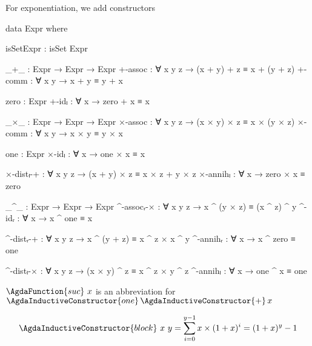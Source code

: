 For exponentiation, we add constructors
\begin{code}
  data Expr where
\end{code}
\begin{code}[hide]
    isSetExpr : isSet Expr

    _+_ : Expr → Expr → Expr
    +-assoc : ∀ x y z → (x + y) + z ≡ x + (y + z)
    +-comm : ∀ x y → x + y ≡ y + x

    zero : Expr
    +-idₗ : ∀ x → zero + x ≡ x

    _×_ : Expr → Expr → Expr
    ×-assoc : ∀ x y z → (x × y) × z ≡ x × (y × z)
    ×-comm : ∀ x y → x × y ≡ y × x

    one : Expr
    ×-idₗ : ∀ x → one × x ≡ x

    ×-distₗ-+ : ∀ x y z → (x + y) × z ≡ x × z + y × z
    ×-annihₗ : ∀ x → zero × x ≡ zero
\end{code}
\begin{code}
    _^_ : Expr → Expr → Expr
    ^-assocᵣ-× : ∀ x y z → x ^ (y × z) ≡ (x ^ z) ^ y
    ^-idᵣ : ∀ x → x ^ one ≡ x

    ^-distᵣ-+ : ∀ x y z → x ^ (y + z) ≡ x ^ z × x ^ y
    ^-annihᵣ : ∀ x → x ^ zero ≡ one

    ^-distₗ-× : ∀ x y z → (x × y) ^ z ≡ x ^ z × y ^ z
    ^-annihₗ : ∀ x → one ^ x ≡ one
\end{code}
$\AgdaFunction{suc}\ x$ is an abbreviation for $\AgdaInductiveConstructor{one}
\mathop{\AgdaInductiveConstructor{+}} x$

\[\AgdaInductiveConstructor{block}\ x\ y = \sum_{i=0}^{y-1} x \times (1 + x)^i = (1+x)^y - 1\]


